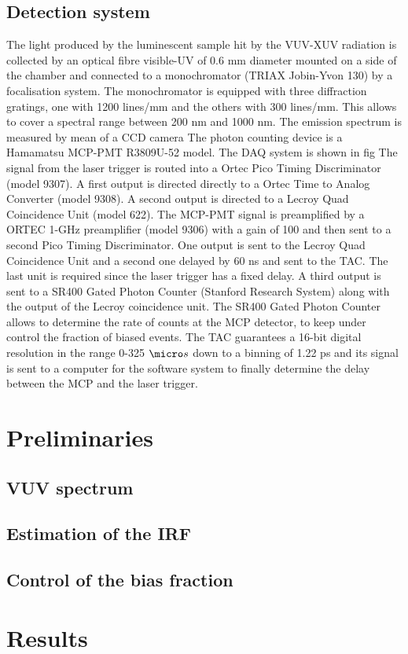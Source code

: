 \subsection{Detection system}
The light produced by the luminescent sample hit by the VUV-XUV radiation is collected by an optical fibre visible-UV of 0.6 mm diameter mounted on a side of the chamber and connected to a monochromator (TRIAX Jobin-Yvon 130) by a focalisation system.
The monochromator is equipped with three diffraction gratings, one with 1200 lines/mm and the others with 300 lines/mm. This allows to cover a spectral range between 200 nm and 1000 nm.
The emission spectrum is measured by mean of a CCD camera 
The photon counting device is a Hamamatsu MCP-PMT R3809U-52 model. The DAQ system is shown in fig
The signal from the laser trigger is routed into a Ortec Pico Timing Discriminator (model 9307). A first output is directed directly to a Ortec Time to Analog Converter (model 9308).
A second output is directed to a Lecroy Quad Coincidence Unit (model 622).
The MCP-PMT signal is preamplified by a ORTEC 1-GHz preamplifier (model 9306) with a gain of 100 and then sent to a second Pico Timing Discriminator. One output is sent to the Lecroy Quad Coincidence Unit and a second one delayed by 60 ns and sent to the TAC. The last unit is required since the laser trigger has a fixed delay. 
A third output is sent to a SR400 Gated Photon Counter (Stanford Research System) along with the output of the Lecroy coincidence unit.
The SR400 Gated Photon Counter allows to determine the rate of counts at the MCP detector, to keep under control the fraction of biased events.
The TAC guarantees a 16-bit digital resolution in the range 0-325 $\micro s$ down to a binning of 1.22 ps and its signal is sent to a computer for the software system to finally determine the delay between the MCP and the laser trigger.

\section{Preliminaries}
\subsection{VUV spectrum}
\subsection{Estimation of the IRF}
\subsection{Control of the bias fraction}

\section{Results}